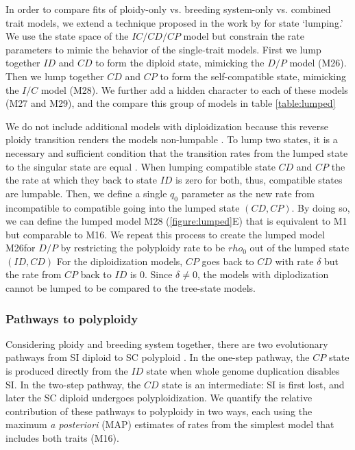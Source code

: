 In order to compare fits of ploidy-only vs. breeding system-only vs. combined trait models, we extend a  technique proposed in the work by \citet{tarasov_2019} for state `lumping.'
We use the state space of the $IC/CD/CP$ model but constrain the rate parameters to mimic the behavior of the single-trait models.
First we lump together $ID$ and $CD$ to form the diploid state, mimicking the $D/P$ model (M26).
Then we lump together $CD$ and $CP$ to form the self-compatible state, mimicking the $I/C$ model (M28).
We further add a hidden character to each of these models (M27 and M29), and the compare this group of models in table \cref{table:lumped}

We do not include additional models with diploidization because this reverse ploidy transition renders the models non-lumpable \citep{tarasov_2019}.
To lump two states, it is a necessary and sufficient condition that the transition rates from the lumped state to the singular state are equal  \citet{tarasov_2019}.
When lumping compatible state $CD$ and $CP$ the the rate at which they back to state $ID$ is zero for both, thus, compatible states are lumpable. 
Then, we define a single $q_0$ parameter as the new rate from incompatible to compatible going into the lumped state $(CD,CP)$.
By doing so, we can define the lumped model M28 (\cref{figure:lumped}E) that is equivalent to M1 but comparable to M16.
We repeat this process to create the lumped model M26for $D/P$ by restricting the polyploidy rate to be $rho_0$ out of the lumped state $(ID,CD)$
For the diploidization models, $CP$ goes back to $CD$ with rate $\delta$ but the rate from $CP$ back to $ID$ is 0.
Since $\delta \neq 0$, the models with diplodization cannot be lumped to be compared to the tree-state models.

\subsubsection{Pathways to polyploidy}

Considering ploidy and breeding system together, there are two evolutionary pathways from SI diploid to SC polyploid \citep{brunet2001, robertson_2011}.
In the one-step pathway, the $CP$ state is produced directly from the $ID$ state when whole genome duplication disables SI.
In the two-step pathway, the $CD$ state is an intermediate: SI is first lost, and later the SC diploid undergoes polyploidization.
We quantify the relative contribution of these pathways to polyploidy in two ways, each using the maximum \textit{a posteriori} (MAP) estimates of rates from the simplest model that includes both traits (M16).

